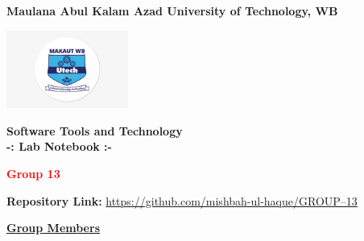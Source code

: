 \documentclass[a4paper,12pt]{article}
\begin{document}
\begin{titlepage}
    \centering
    \vspace*{0 cm}
    \Large
    \textbf{Maulana Abul Kalam Azad University of Technology, WB}
    \vspace{0.5cm}
    
    \includegraphics[width=0.3\textwidth]{306-3063564_maulana-abul-kalam-azad-university-logo.png} %
    \vspace{0.5cm}
    
    \LARGE
    \textbf{\textcolor{blue!60}{Software Tools and Technology\\
        -: Lab Notebook :-}}
    \vspace{0.5cm}
    
    \large
    \textbf{\textcolor{red}{Group 13}}
    \vspace{1 cm}
    
    \textbf{Repository Link:} \href{https://github.com/mishbah-ul-haque/GROUP--13}{https://github.com/mishbah-ul-haque/GROUP--13}
    \vspace{1cm}
    
    \textbf{\underline{\textcolor{blue!60}{Group Members}}}
    \vspace{0.5cm}


\end{titlepage}
\end{document}
